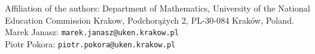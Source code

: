 \documentclass[11pt]{article}
\theoremstyle{plain}
\theoremstyle{definition}
\theoremstyle{remark}
\begin{document}
\bigskip
Affiliation of the authors:
\noindent
Department of Mathematics,
University of the National Education Commission Krakow,
Podchor\k{a}\.zych 2,
PL-30-084 Krak\'ow, Poland. \\
\nopagebreak
\noindent
Marek Janasz: \texttt{marek.janasz@uken.krakow.pl} \\
Piotr Pokora: \texttt{piotr.pokora@uken.krakow.pl}
\end{document}
